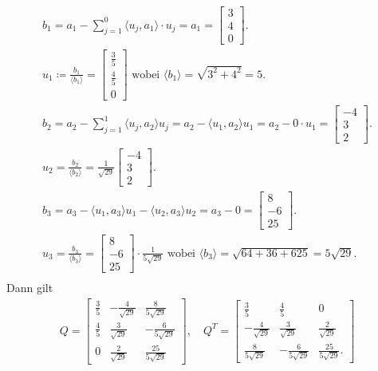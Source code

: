 \documentclass[fleqn,draft,a5paper]{article}
\providecommand{\skp}[1]{\langle#1\rangle}
\theoremstyle{remark}
\begin{document}
\begin{multline*}
  b_{1} = a_{1} - \sum_{j=1}^{0}\skp{u_{j}, a_{1}} \cdot u_{j} = a_{1} =
  \begin{bmatrix}
    3 \\ 4 \\ 0
  \end{bmatrix}. \\
  u_{1} \coloneq \frac{b_{1}}{\skp{b_{1}}} =
  \begin{bmatrix}
    \frac35 \\ \frac45 \\ 0
  \end{bmatrix}
  \text{ wobei } \skp{b_{1}} = \sqrt{3^{2} + 4^{2}} = 5. \\
  b_{2} = a_{2} - \sum_{j=1}^{1}\skp{u_{j}, a_{2}}u_{j} = a_{2} -
  \skp{u_{1}, a_{2}} u_{1} = a_{2} - 0 \cdot u_{1} =
  \begin{bmatrix}
    -4 \\ 3\\ 2
  \end{bmatrix}. \\
  u_{2} = \frac{b_{2}}{\skp{b_{2}}} =
  \frac{1}{\sqrt{29}}
  \begin{bmatrix}
    -4 \\ 3 \\ 2
  \end{bmatrix}. \\
  b_{3} = a_{3} - \skp{u_{1}, a_{3}}u_{1} - \skp{u_{2}, a_{3}}u_{2} =
  a_{3} - 0 =
  \begin{bmatrix}
    8 \\ -6 \\ 25
  \end{bmatrix}. \\
  u_{3} = \frac{b_{3}}{\skp{b_{3}}} =
  \begin{bmatrix}
    8 \\ -6 \\ 25
  \end{bmatrix} \cdot \frac{1}{5\sqrt{29}} \text{ wobei } \skp{b_{3}} =
    \sqrt{64 + 36 + 625} = 5 \sqrt{29}. \\
  \end{multline*}
  Dann gilt
  \begin{align*}
    Q =
    \begin{bmatrix}
      \frac35 & - \frac{4}{\sqrt{29}} & \frac{8}{5\sqrt{29}} \\
      \frac45 & \frac{3}{\sqrt{29}} & - \frac{6}{5\sqrt{29}} \\
      0 & \frac{2}{\sqrt{29}} & \frac{25}{5\sqrt{29}}
    \end{bmatrix},
    \quad
    Q^{T} =
    \begin{bmatrix}
      \frac35 & \frac45 & 0 \\
      -\frac{4}{\sqrt{29}} & \frac{3}{\sqrt{29}} & \frac{2}{\sqrt{29}}
      \\
      \frac{8}{5\sqrt{29}} & -\frac{6}{5\sqrt{29}} & \frac{25}{5\sqrt{29}}.
    \end{bmatrix}
  \end{align*}
\end{document}
